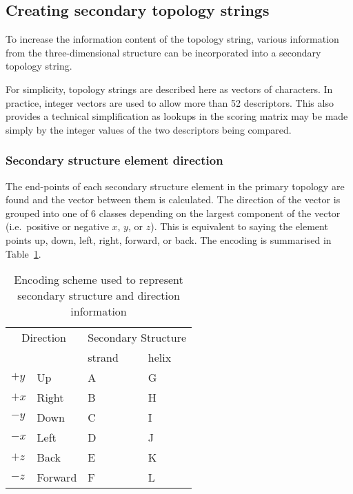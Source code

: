 \documentclass{article}
\begin{document}
\subsection{Creating secondary topology strings}
To increase the information content of the topology string, various
information from the three-dimensional structure can be incorporated
into a secondary topology string. 

For simplicity, topology strings are described here as vectors of
characters. In practice, integer vectors are used to allow more than
52 descriptors. This also provides a technical simplification as
lookups in the scoring matrix may be made simply by the integer values
of the two descriptors being compared.

\subsubsection{Secondary structure element direction}
The end-points of each secondary structure element in the primary
topology are found and the vector between them is calculated. The
direction of the vector is grouped into one of 6 classes depending on
the largest component of the vector (i.e.\ positive or negative $x$,
$y$, or $z$). This is equivalent to saying the element points up,
down, left, right, forward, or back. The encoding is summarised in
Table~\ref{tab:encoding}.

\begin{table}
\begin{center}
\begin{tabular}{llll} \hline
\multicolumn{2}{c}{Direction} & \multicolumn{2}{c}{Secondary Structure}\\ \cline{3-4}
          &         & strand & helix  \\ \hline
$+y$      & Up      & A      & G      \\
$+x$      & Right   & B      & H      \\
$-y$      & Down    & C      & I      \\
$-x$      & Left    & D      & J      \\
$+z$      & Back    & E      & K      \\
$-z$      & Forward & F      & L      \\ \hline
\end{tabular}
\end{center}
\caption{\label{tab:encoding}Encoding scheme used to represent
          secondary structure and direction information}
\end{table}
\end{document}
